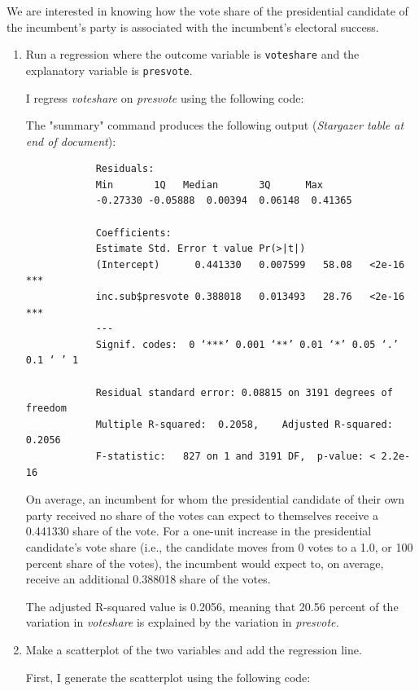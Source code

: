 \documentclass[12pt,letterpaper]{article}
\begin{document}
\noindent We are interested in knowing how the vote share of the presidential candidate of the incumbent's party is associated with the incumbent's electoral success.
	\vspace{.25cm}
	\begin{enumerate}
		\item Run a regression where the outcome variable is \texttt{voteshare} and the explanatory variable is \texttt{presvote}.
			\vspace{.5cm}
			
			I regress \textit{voteshare} on \textit{presvote} using the following code:
			
			
			The "summary" command produces the following output (\textit{Stargazer table at end of document}):
			
				\begin{verbatim}
			Residuals:
			Min       1Q   Median       3Q      Max 
			-0.27330 -0.05888  0.00394  0.06148  0.41365 
			
			Coefficients:
			Estimate Std. Error t value Pr(>|t|)    
			(Intercept)      0.441330   0.007599   58.08   <2e-16 ***
			inc.sub$presvote 0.388018   0.013493   28.76   <2e-16 ***
			---
			Signif. codes:  0 ‘***’ 0.001 ‘**’ 0.01 ‘*’ 0.05 ‘.’ 0.1 ‘ ’ 1
			
			Residual standard error: 0.08815 on 3191 degrees of freedom
			Multiple R-squared:  0.2058,	Adjusted R-squared:  0.2056 
			F-statistic:   827 on 1 and 3191 DF,  p-value: < 2.2e-16
			\end{verbatim}
			
			On average, an incumbent for whom the presidential candidate of their own party received no share of the votes can expect to themselves receive a 0.441330 share of the vote. For a one-unit increase in the presidential candidate's vote share (i.e., the candidate moves from 0 votes to a 1.0, or 100 percent share of the votes), the incumbent would expect to, on average, receive an additional 0.388018 share of the votes. 
			
			The adjusted R-squared value is 0.2056, meaning that 20.56 percent of the variation in \textit{voteshare} is explained by the variation in \textit{presvote.}
			
		\item Make a scatterplot of the two variables and add the regression line. 
			\vspace{.5cm}
			
			First, I generate the scatterplot using the following code:
			

\end{enumerate}
\end{document}
